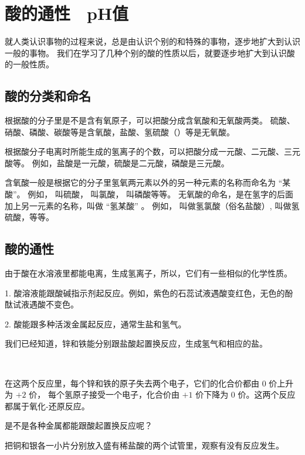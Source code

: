 \section{酸的通性　pH值}\label{sec:5-4}

就人类认识事物的过程来说，总是由认识个别的和特殊的事物，逐步地扩大到认识一般的事物。
我们在学习了几种个别的酸的性质以后，就要逐步地扩大到认识酸的一般性质。

\subsection{酸的分类和命名}

根据酸的分子里是不是含有氧原子，可以把酸分成含氧酸和无氧酸两类。
硫酸、硝酸、磷酸、碳酸等是含氧酸，盐酸、氢硫酸（）等是无氧酸。

根据酸分子电离时所能生成的氢离子的个数，可以把酸分成一元酸、二元酸、三元酸等。
例如，盐酸是一元酸，硫酸是二元酸，磷酸是三元酸。

含氧酸一般是根据它的分子里氢氧两元素以外的另一种元素的名称而命名为 “某酸”。
例如， 叫硫酸，  叫氯酸，  叫磷酸等等。
无氧酸的命名，是在氢字的后面加上另一元素的名称，叫做 “氢某酸” 。
例如， 叫做氢氯酸（俗名盐酸）,  叫做氢硫酸，等等。


\subsection{酸的通性}

由于酸在水溶液里都能电离，生成氢离子，所以，它们有一些相似的化学性质。

1. 酸溶液能跟酸碱指示剂起反应。例如，紫色的石蕊试液遇酸变红色，无色的酚酞试液遇酸不变色。

2. 酸能跟多种活泼金属起反应，通常生盐和氢气。

我们已经知道，锌和铁能分别跟盐酸起置换反应，生成氢气和相应的盐。
\begin{fangchengshi}
     \\[-0.5em]
\end{fangchengshi}

在这两个反应里，每个锌和铁的原子失去两个电子，它们的化合价都由 $0$ 价上升为 $+2$ 价，
每个氢原子接受一个电子，化合价由 $+1$ 价下降为 $0$ 价。这两个反应都属于氧化-还原反应。

是不是各种金属都能跟酸起置换反应呢？

\begin{shiyan}
    把铜和银各一小片分别放入盛有稀盐酸的两个试管里，观察有没有反应发生。
\end{shiyan}

